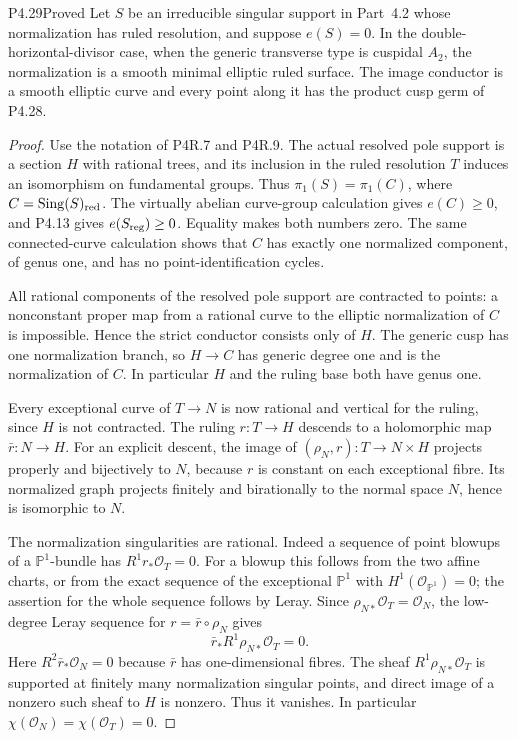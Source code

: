 \begin{statement}{P4.29}{Proved}
Let $S$ be an irreducible singular support
in Part~4.2 whose normalization has ruled
resolution, and suppose $e(S)=0$.
In the double-horizontal-divisor case,
when the generic transverse type is
cuspidal $A_2$, the normalization is
a smooth minimal elliptic ruled surface.
The image conductor is a smooth elliptic
curve and every point along it has the
product cusp germ of P4.28.
\end{statement}
\begin{proof}
Use the notation of P4R.7 and P4R.9.
The actual resolved pole support is
a section $H$ with rational trees,
and its inclusion in the ruled
resolution $T$ induces an isomorphism
on fundamental groups. Thus
$\pi_1(S)=\pi_1(C)$, where
$C=\operatorname{Sing}(S)_{\rm red}$.
The virtually abelian curve-group
calculation gives $e(C)\ge0$, and
P4.13 gives $e(S_{\rm reg})\ge0$.
Equality makes both numbers zero.
The same connected-curve calculation
shows that $C$ has exactly one
normalized component, of genus one,
and has no point-identification
cycles.

All rational components of the
resolved pole support are contracted
to points: a nonconstant proper map
from a rational curve to the
elliptic normalization of $C$ is
impossible. Hence the strict
conductor consists only of $H$.
The generic cusp has one
normalization branch, so
$H\to C$ has generic degree one
and is the normalization of $C$.
In particular $H$ and the ruling
base both have genus one.

Every exceptional curve of
$T\to N$ is now rational and
vertical for the ruling, since
$H$ is not contracted. The ruling
$r:T\to H$ descends to a holomorphic
map $\bar r:N\to H$. For an explicit
descent, the image of
$(\rho_N,r):T\to N\times H$
projects properly and bijectively
to $N$, because $r$ is constant
on each exceptional fibre. Its
normalized graph projects finitely
and birationally to the normal
space $N$, hence is isomorphic
to $N$.

The normalization singularities
are rational. Indeed a sequence
of point blowups of a
$\mathbb P^1$-bundle has
$R^1r_*\mathcal O_T=0$.
For a blowup this follows from
the two affine charts, or from
the exact sequence of the
exceptional $\mathbb P^1$ with
$H^1(\mathcal O_{\mathbb P^1})=0$;
the assertion for the whole
sequence follows by Leray.
Since $\rho_{N*}\mathcal O_T
=\mathcal O_N$, the low-degree
Leray sequence for
$r=\bar r\circ\rho_N$ gives
\[
 \bar r_*R^1\rho_{N*}\mathcal O_T=0.
\]
Here $R^2\bar r_*\mathcal O_N=0$
because $\bar r$ has one-dimensional
fibres. The sheaf
$R^1\rho_{N*}\mathcal O_T$ is
supported at finitely many
normalization singular points,
and direct image of a nonzero
such sheaf to $H$ is nonzero.
Thus it vanishes. In particular
$\chi(\mathcal O_N)
=\chi(\mathcal O_T)=0$.


\end{proof}
